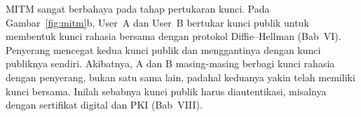 MITM sangat berbahaya pada tahap pertukaran kunci. Pada Gambar~\ref{fig:mitm}b, User~A dan User~B bertukar kunci publik untuk membentuk kunci rahasia bersama dengan protokol Diffie--Hellman (Bab~VI). Penyerang mencegat kedua kunci publik dan menggantinya dengan kunci publiknya sendiri. Akibatnya, A dan B masing-masing berbagi kunci rahasia dengan penyerang, bukan satu sama lain, padahal keduanya yakin telah memiliki kunci bersama. Inilah sebabnya kunci publik harus diautentikasi, misalnya dengan sertifikat digital dan PKI (Bab~VIII).

